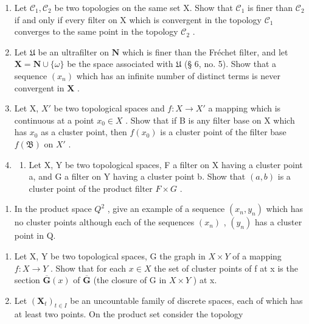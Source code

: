 \BourbakiExerciseGroup

\begin{enumerate}
\def\labelenumi{\arabic{enumi})}
\item
  Let \(\mathcal{C}_1, \mathcal{C}_2\) be two topologies on the same set X. Show that \(\mathcal{C}_1\) is finer than \(\mathcal{C}_2\) if and only if every filter on X which is convergent in the topology \(\mathcal{C}_1\) converges to the same point in the topology \(\mathcal{C}_2\) .
\item
  Let \(\mathfrak{U}\) be an ultrafilter on \(\mathbf{N}\) which is finer than the Fréchet filter, and let \(\mathbf{X} = \mathbf{N} \cup \{\omega\}\) be the space associated with \(\mathfrak{U}\) (§ 6, no. 5). Show that a sequence \((x_n)\) which has an infinite number of distinct terms is never convergent in \(\mathbf{X}\) .
\item
  Let X, \(X'\) be two topological spaces and \(f: X \to X'\) a mapping which is continuous at a point \(x_{0} \in X\) . Show that if B is any filter base on X which has \(x_{0}\) as a cluster point, then \(f(x_{0})\) is a cluster point of the filter base \(f(\mathfrak{B})\) on \(X'\) .
\item
  \begin{enumerate}
  \def\labelenumii{\alph{enumii})}
  \tightlist
  \item
    Let X, Y be two topological spaces, F a filter on X having a cluster point a, and G a filter on Y having a cluster point b. Show that \((a, b)\) is a cluster point of the product filter \(F \times G\) .
  \end{enumerate}
\end{enumerate}

\begin{enumerate}
\def\labelenumi{\alph{enumi})}
\setcounter{enumi}{1}
\tightlist
\item
  In the product space \(Q^{2}\) , give an example of a sequence \((x_{n}, y_{n})\) which has no cluster points although each of the sequences \((x_{n})\) , \((y_{n})\) has a cluster point in Q.
\end{enumerate}

\begin{enumerate}
\def\labelenumi{\arabic{enumi})}
\setcounter{enumi}{4}
\item
  Let X, Y be two topological spaces, G the graph in \(X \times Y\) of a mapping \(f: X \to Y\) . Show that for each \(x \in X\) the set of cluster points of f at x is the section \(\overline{\mathbf{G}}(x)\) of \(\overline{\mathbf{G}}\) (the closure of G in \(X \times Y\) ) at x.
\item
  Let \((\mathbf{X}_t)_{t\in I}\) be an uncountable family of discrete spaces, each of which has at least two points. On the product set consider the topology
\end{enumerate}

